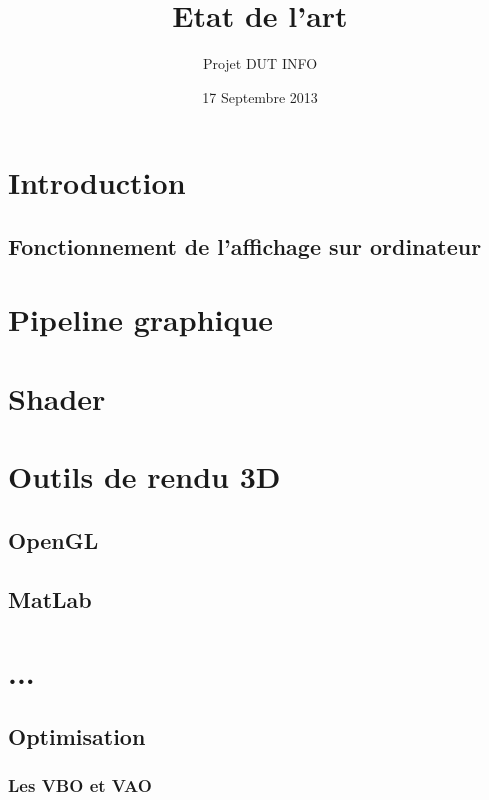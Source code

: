 \documentclass[12pt,a4paper,openany]{report}
\title{Etat de l'art}
\author{Projet DUT INFO}
\date{17 Septembre 2013}
\begin{document}
\maketitle

\hypertarget{tableofcontents}{} %
\tableofcontents

\part{Introduction}

\chapter{Fonctionnement de l'affichage sur ordinateur}


\part{Pipeline graphique}


\part{Shader}


\part{Outils de rendu 3D}

\chapter{OpenGL}


\chapter{MatLab}


\part{...}
\chapter{Optimisation}
\section{Les VBO et VAO}



\newpage
\end{document}
